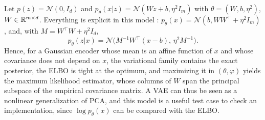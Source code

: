 \documentclass[english,graybox,envcountchap,envcountsame,sectrefs,shortlabels]{svmono}
\theoremstyle{style}
\newcommand{\gauss}{\mathcal{N}}
\newcommand{\eqsp}{}
\begin{document}
\begin{example}
\label{ex:ppca}
Let $p(z) = \gauss(0,I_d)$ and $p_\theta(x|z) = \gauss(Wz+b,\eta^2I_m)$ with $\theta = (W,b,\eta^2)$, $W\in\mathbb{R}^{m\times d}$. Everything is explicit in this model \cite{tipping1999probabilistic}: $p_\theta(x) = \gauss(b,WW^\top+\eta^2I_m)$, and, with $M = W^\top W+\eta^2I_d$,
$$
p_\theta(z|x) = \gauss\big(M^{-1}W^\top(x-b),\,\eta^2M^{-1}\big)\eqsp.
$$
Hence, for a Gaussian encoder whose mean is an affine function of $x$ and whose covariance does not depend on $x$, the variational family contains the exact posterior, the ELBO is tight at the optimum, and maximizing it in $(\theta,\varphi)$ yields the maximum likelihood estimator, whose columns of $W$ span the principal subspace of the empirical covariance matrix. A VAE can thus be seen as a nonlinear generalization of PCA, and this model is a useful test case to check an implementation, since $\log p_\theta(x)$ can be compared with the ELBO.
\end{example}

\end{document}
